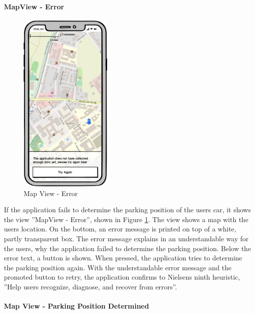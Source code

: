 \paragraph{MapView - Error}

\begin{figure}[h]
    \centering
    \includegraphics[width=0.4\textwidth]{images/UI/Iteration4-MapView-Error.png}
    \caption{Map View - Error}
    \label{fig:mv-error}
\end{figure}

If the application fails to determine the parking position of the users car, it shows the view ''MapView - Error'', shown in Figure \ref{fig:mv-error}. The view shows a map with the users location. On the bottom, an error message is printed on top of a white, partly transparent box. The error message explains in an understandable way for the users, why the application failed to determine the parking position. Below the error text, a button is shown. When pressed, the application tries to determine the parking position again. With the understandable error message and the promoted button to retry, the application confirms to Nielsens ninth heuristic, ''Help users recognize, diagnose, and recover from errors''. \cite{nielsen1994usability}

\paragraph{Map View - Parking Position Determined}

